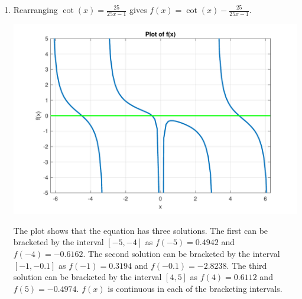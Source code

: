 \documentclass[a4paper,11pt]{article}
\begin{document}
\begin{enumerate}
\begin{enumerate}
		
		\item Rearranging $\cot(x) = \frac{25}{25x-1}$ gives $f(x) = \cot(x) 
		- \frac{25}{25x-1}$.
		
		\begin{center}
			\includegraphics[scale=0.5]{images/Q1a_iii.pdf}
		\end{center}
		The plot shows that the equation has three solutions. The first can 
		be bracketed by the interval $[-5,-4]$ as $f(-5)=0.4942$ and 
		$f(-4)=-0.6162$. The 
		second solution can be bracketed by the interval $[-1,-0.1]$ as 
		$f(-1)=0.3194$ and 
		$f(-0.1)=-2.8238$. The third solution can be bracketed by the 
		interval $[4,5]$ as 
		$f(4)=0.6112$ and $f(5)=-0.4974$. $f(x)$ is continuous in each of the 
		bracketing intervals.
	

\end{enumerate}
\end{enumerate}
\end{document}
